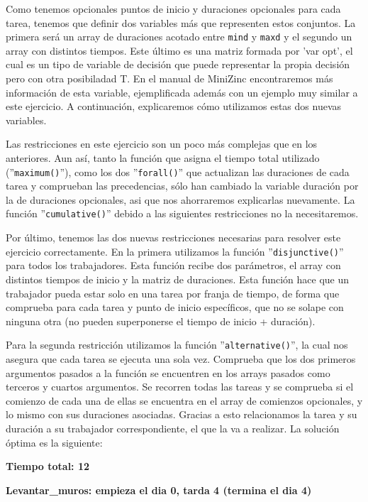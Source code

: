 \documentclass[11pt,a4paper]{article}
\begin{document}
Como tenemos opcionales puntos de inicio y duraciones opcionales para cada tarea, tenemos que definir dos variables más que representen estos
conjuntos. La primera será un array de duraciones acotado entre \texttt{mind} y \texttt{maxd} y el segundo un array con distintos tiempos. Este
último es una matriz formada por 'var opt', el cual es un tipo de variable de decisión que puede representar la propia decisión pero con otra
posibiladad T. En el manual de MiniZinc encontraremos más información de esta variable, ejemplificada además con un ejemplo muy similar a este
ejercicio. A continuación, explicaremos cómo utilizamos estas dos nuevas variables.

Las restricciones en este ejercicio son un poco más complejas que en los anteriores. Aun así, tanto la función que asigna el tiempo total
utilizado (''\texttt{maximum()}''), como los dos ''\texttt{forall()}'' que actualizan las duraciones de cada tarea y comprueban las precedencias, sólo
han cambiado la variable duración por la de duraciones opcionales, asi que nos ahorraremos explicarlas nuevamente. La función
''\texttt{cumulative()}'' debido a las siguientes restricciones no la necesitaremos.

Por último, tenemos las dos nuevas restricciones necesarias para resolver este ejercicio correctamente. En la primera utilizamos la función
''\texttt{disjunctive()}'' para todos los trabajadores. Esta función recibe dos parámetros, el array con distintos tiempos de inicio y la matriz
de duraciones. Esta función hace que un trabajador pueda estar solo en una tarea por franja de tiempo, de forma que comprueba para cada tarea
y punto de inicio específicos, que no se solape con ninguna otra (no pueden superponerse el tiempo de inicio + duración).

Para la segunda restricción utilizamos la función ''\texttt{alternative()}'', la cual nos asegura que cada tarea se ejecuta una sola vez. 
Comprueba que los dos primeros argumentos pasados a la función se encuentren en los arrays pasados como terceros y cuartos argumentos. Se
recorren todas las tareas y se comprueba si el comienzo de cada una de ellas se encuentra en el array de comienzos opcionales, y lo mismo con
sus duraciones asociadas. Gracias a esto relacionamos la tarea y su duración a su trabajador correspondiente, el que la va a realizar.
\newpage
La solución óptima es la siguiente:

\textbf{Tiempo total: 12} \vspace{-8px}

\textbf{Levantar\_muros: empieza el dia 0, tarda 4 (termina el dia 4)} \vspace{-8px}
\end{document}
